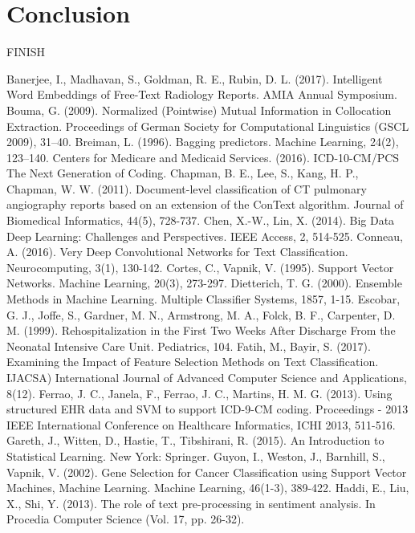 \documentclass[conference]{IEEEtran}
\begin{document}
\section{Conclusion}
FINISH

\begin{thebibliography}{00}
 Banerjee, I., Madhavan, S., Goldman, R. E., Rubin, D. L. (2017). Intelligent Word Embeddings of Free-Text Radiology Reports. AMIA Annual Symposium.
 Bouma, G. (2009). Normalized (Pointwise) Mutual Information in Collocation Extraction. Proceedings of German Society for Computational Linguistics (GSCL 2009), 31–40.
 Breiman, L. (1996). Bagging predictors. Machine Learning, 24(2), 123–140.
Centers for Medicare and Medicaid Services. (2016). ICD-10-CM/PCS The Next Generation of Coding.
 Chapman, B. E., Lee, S., Kang, H. P., Chapman, W. W. (2011). Document-level classification of CT pulmonary angiography reports based on an extension of the ConText algorithm. Journal of Biomedical Informatics, 44(5), 728-737.
 Chen, X.-W., Lin, X. (2014). Big Data Deep Learning: Challenges and Perspectives. IEEE Access, 2, 514-525.
 Conneau, A. (2016). Very Deep Convolutional Networks for Text Classification. Neurocomputing, 3(1), 130-142.
 Cortes, C., Vapnik, V. (1995). Support Vector Networks. Machine Learning, 20(3), 273-297.
 Dietterich, T. G. (2000). Ensemble Methods in Machine Learning. Multiple Classifier Systems, 1857, 1-15.
 Escobar, G. J., Joffe, S., Gardner, M. N., Armstrong, M. A., Folck, B. F., Carpenter, D. M. (1999). Rehospitalization in the First Two Weeks After Discharge From the Neonatal Intensive Care Unit. Pediatrics, 104.
 Fatih, M., Bayir, S. (2017). Examining the Impact of Feature Selection Methods on Text Classification. IJACSA) International Journal of Advanced Computer Science and Applications, 8(12).
 Ferrao, J. C., Janela, F., Ferrao, J. C., Martins, H. M. G. (2013). Using structured EHR data and SVM to support ICD-9-CM coding. Proceedings - 2013 IEEE International Conference on Healthcare Informatics, ICHI 2013, 511-516.
 Gareth, J., Witten, D., Hastie, T., Tibshirani, R. (2015). An Introduction to Statistical Learning. New York: Springer.
 Guyon, I., Weston, J., Barnhill, S., Vapnik, V. (2002). Gene Selection for Cancer Classification using Support Vector Machines, Machine Learning. Machine Learning, 46(1-3), 389-422.
 Haddi, E., Liu, X., Shi, Y. (2013). The role of text pre-processing in sentiment analysis. In Procedia Computer Science (Vol. 17, pp. 26-32).

\end{thebibliography}
\end{document}
